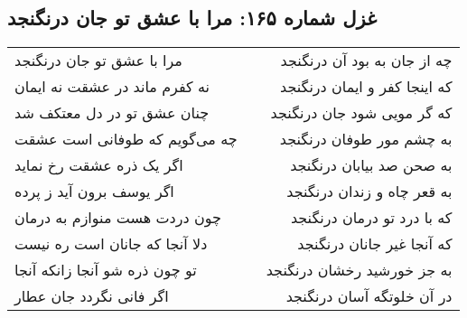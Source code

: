 \begin{center}
\section*{غزل شماره ۱۶۵: مرا با عشق تو جان درنگنجد}
\label{sec:165}
\begin{longtable}{l p{0.5cm} r}
مرا با عشق تو جان درنگنجد
&&
چه از جان به بود آن درنگنجد
\\
نه کفرم ماند در عشقت نه ایمان
&&
که اینجا کفر و ایمان درنگنجد
\\
چنان عشق تو در دل معتکف شد
&&
که گر مویی شود جان درنگنجد
\\
چه می‌گویم که طوفانی است عشقت
&&
به چشم مور طوفان درنگنجد
\\
اگر یک ذره عشقت رخ نماید
&&
به صحن صد بیابان درنگنجد
\\
اگر یوسف برون آید ز پرده
&&
به قعر چاه و زندان درنگنجد
\\
چون دردت هست منوازم به درمان
&&
که با درد تو درمان درنگنجد
\\
دلا آنجا که جانان است ره نیست
&&
که آنجا غیر جانان درنگنجد
\\
تو چون ذره شو آنجا زانکه آنجا
&&
به جز خورشید رخشان درنگنجد
\\
اگر فانی نگردد جان عطار
&&
در آن خلوتگه آسان درنگنجد
\\
\end{longtable}
\end{center}
